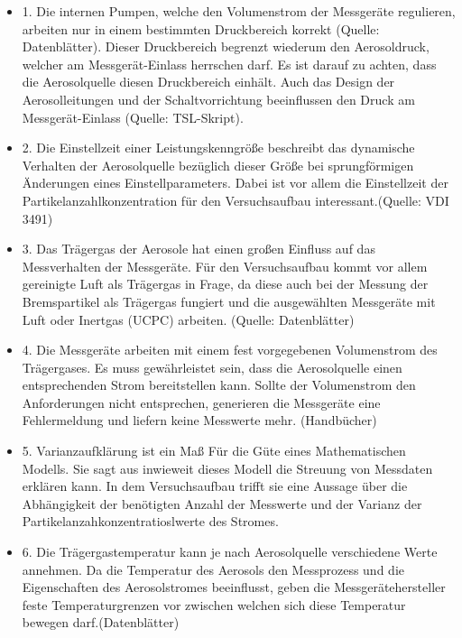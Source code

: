 \begin{itemize}
\item 1. Die internen Pumpen, welche den Volumenstrom der Messger\"{a}te regulieren, arbeiten nur in einem bestimmten Druckbereich korrekt (Quelle: Datenbl\"{a}tter). Dieser Druckbereich begrenzt wiederum den Aerosoldruck, welcher am Messger\"{a}t-Einlass herrschen darf. Es ist darauf zu achten, dass die Aerosolquelle diesen Druckbereich einh\"{a}lt. 
Auch das Design der Aerosolleitungen und der Schaltvorrichtung beeinflussen den Druck am Messgerät-Einlass (Quelle: TSL-Skript).

\item 2. Die Einstellzeit einer Leistungskenngr\"{o}{\ss}e beschreibt das dynamische Verhalten der Aerosolquelle bez\"{u}glich dieser Gr\"{o}{\ss}e bei sprungf\"{o}rmigen \"{A}nderungen eines Einstellparameters. Dabei ist vor allem die Einstellzeit der Partikelanzahlkonzentration für den Versuchsaufbau interessant.(Quelle: VDI 3491)

\item 3. Das Tr\"{a}gergas der Aerosole hat einen gro{\ss}en Einfluss auf das Messverhalten der Messger\"{a}te.  Für den Versuchsaufbau kommt vor allem gereinigte Luft als Tr\"{a}gergas in Frage, da diese auch bei der Messung der Bremspartikel als Tr\"{a}gergas fungiert und die ausgew\"{a}hlten Messger\"{a}te mit Luft oder Inertgas (UCPC) arbeiten. (Quelle: Datenbl\"{a}tter)

\item 4. Die Messger\"{a}te arbeiten mit einem fest vorgegebenen Volumenstrom des Tr\"{a}gergases.  Es muss gew\"{a}hrleistet sein, dass die Aerosolquelle einen entsprechenden Strom bereitstellen kann. Sollte der Volumenstrom den Anforderungen nicht entsprechen, generieren die Messger\"{a}te eine Fehlermeldung und liefern keine Messwerte mehr. (Handb\"{u}cher)

\item 5. Varianzaufkl\"{a}rung ist ein Maß Für die G\"{u}te eines Mathematischen Modells. Sie sagt aus inwieweit dieses Modell die Streuung von Messdaten erkl\"{a}ren kann. In dem Versuchsaufbau trifft sie eine Aussage über die Abh\"{a}ngigkeit der ben\"{o}tigten Anzahl der Messwerte und der Varianz der Partikelanzahkonzentratioslwerte des Stromes.

\item 6. Die Tr\"{a}gergastemperatur kann je nach Aerosolquelle verschiedene Werte annehmen. Da die Temperatur des Aerosols den Messprozess und die Eigenschaften des Aerosolstromes beeinflusst, geben die Messger\"{a}tehersteller feste Temperaturgrenzen vor zwischen welchen sich diese Temperatur bewegen darf.(Datenbl\"{a}tter)
\end{itemize}


